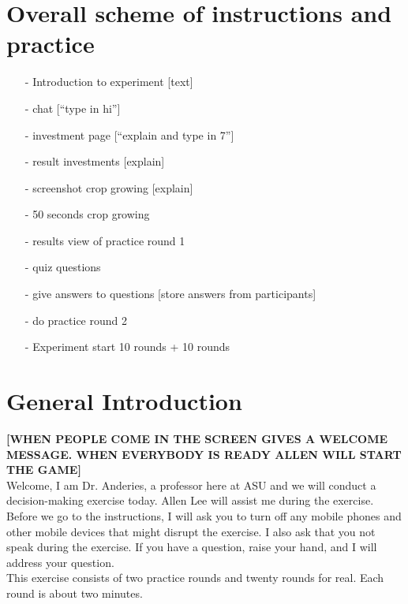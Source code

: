 \documentclass[11pt]{article}
\begin{document}
 


\section*{Overall scheme of instructions and practice}

\begin{itemize}

\item[-] Introduction to experiment [text]
\item[-] chat [``type in hi'']
\item[-] investment page [``explain and type in 7'']
\item[-] result investments [explain]
\item[-] screenshot crop growing [explain]
\item[-] 50 seconds crop growing 
\item[-] results view of practice round 1
\item[-] quiz questions
\item[-] give answers to questions [store answers from participants]
\item[-] do practice round 2
\item[-] Experiment start 10 rounds + 10 rounds
\end{itemize}

\newpage

\section*{General Introduction}


{\bf [WHEN PEOPLE COME IN THE SCREEN GIVES A WELCOME MESSAGE. WHEN
  EVERYBODY IS READY ALLEN WILL START THE GAME]}\\

Welcome, I am Dr. Anderies, a professor here at ASU and we will conduct a
decision-making exercise today. Allen Lee will assist me during the
exercise. Before we go to the instructions,  I will ask you to turn
off any mobile phones and other mobile devices that might  disrupt
the exercise. I also ask that you not speak during the exercise. If
you have a question, raise your hand, and I will address your
question.\\

This exercise consists of two practice rounds and twenty rounds for
real. Each round is about two minutes.\\

\\
\end{document}
